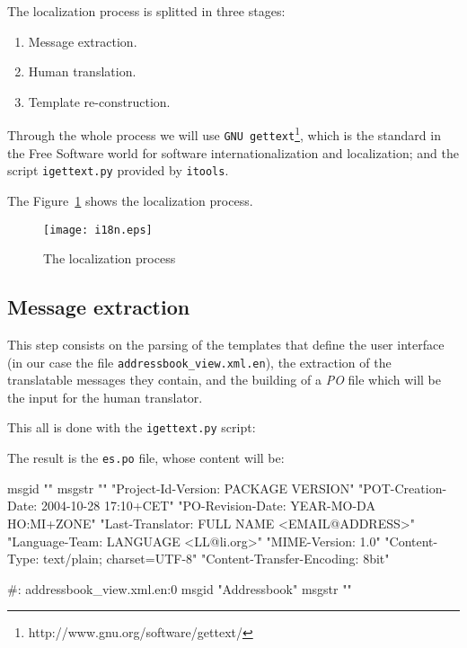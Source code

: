 The localization process is splitted in three stages:

\begin{enumerate}
  \item Message extraction.
  \item Human translation.
  \item Template re-construction.
\end{enumerate}

Through the whole process we will use {\tt GNU
gettext}\footnote{http://www.gnu.org/software/gettext/}, which is the
standard in the Free Software world for software internationalization
and localization; and the script {\tt igettext.py} provided by {\tt itools}.

The Figure~\ref{Figure: i18n} shows the localization process.

\begin{figure}
  \center
  \texttt{[image: i18n.eps]}
  \caption{The localization process}
  \label{Figure: i18n}
\end{figure}

\subsection{Message extraction}

This step consists on the parsing of the templates that define the user
interface (in our case the file {\tt addressbook\_view.xml.en}), the
extraction of the translatable messages they contain, and the building of
a {\em PO} file which will be the input for the human translator.

This all is done with the {\tt igettext.py} script:


The result is the {\tt es.po} file, whose content will be:

\begin{code}
    msgid ""
    msgstr ""
    "Project-Id-Version: PACKAGE VERSION\n"
    "POT-Creation-Date: 2004-10-28 17:10+CET\n"
    "PO-Revision-Date: YEAR-MO-DA HO:MI+ZONE\n"
    "Last-Translator: FULL NAME <EMAIL@ADDRESS>\n"
    "Language-Team: LANGUAGE <LL@li.org>\n"
    "MIME-Version: 1.0\n"
    "Content-Type: text/plain; charset=UTF-8\n"
    "Content-Transfer-Encoding: 8bit\n"

    #: addressbook_view.xml.en:0
    msgid "Addressbook"
    msgstr ""
\end{code}

